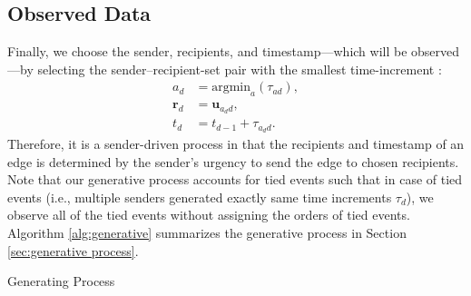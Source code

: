\documentclass[12pt]{article}
\begin{document}
\subsection{Observed Data}\label{subsec:Observed}
Finally, we choose the sender, recipients, and timestamp---which will be observed---by selecting the sender--recipient-set pair with the smallest time-increment \citep{snijders1996stochastic}:
\begin{equation}
\begin{aligned}
a_d &= \mbox{argmin}_{a}(\tau_{ad}),\\
\boldsymbol{r}_d &= \boldsymbol{u}_{a_d d},\\
t_d &=t_{d-1} + \tau_{a_d d}.
\end{aligned}
\end{equation}
Therefore, it is a sender-driven process in that the recipients and timestamp of an edge is determined by the sender's urgency to send the edge to chosen recipients. Note that  our generative process accounts for tied events such that in case of tied events (i.e., multiple senders generated exactly same time increments $\tau_d$), we observe all of the tied events without assigning the orders of tied events. Algorithm \ref{alg:generative} summarizes the generative process in Section \ref{sec:generative process}.
	\begin{algorithm}[ht]
		\SetAlgoLined
		\caption{Generating Process}
			\label{alg:generative}
		\end{algorithm}
\end{document}
